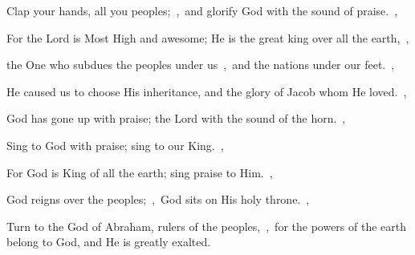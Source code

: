 \documentclass[12pt,twoside,a5paper]{article}
\begin{document}
\begin{normalparskip}
  Clap your hands, all you peoples;~\sep\ and glorify God with the sound of praise.~\sep


  For the Lord is Most High and awesome; He is the great king over all the earth,~\sep

  the One who subdues the peoples under us~\sep\ and the nations under our feet.~\sep

  He caused us to choose His inheritance, and the glory of Jacob whom He loved.~\sep

  God has gone up with praise; the Lord with the sound of the horn.~\sep

  Sing to God with praise; sing to our King.~\sep

  For God is King of all the earth; sing praise to Him.~\sep

  God reigns over the peoples;~\sep\ God sits on His holy throne.~\sep

  Turn to the God of Abraham, rulers of the peoples,~\sep\ for the powers of the earth belong to God, and He is greatly exalted.
\end{normalparskip}

\end{document}
